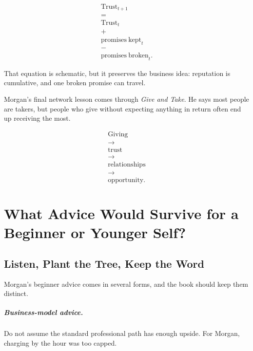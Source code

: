 \documentclass[11pt,oneside]{book}
\begin{document}
\begin{equation}
\begin{gathered}
\mathrm{Trust}_{t+1}\\
=\\
\mathrm{Trust}_{t}\\
+\\
\mathrm{promises\ kept}_{t}\\
-\\
\mathrm{promises\ broken}_{t}.
\end{gathered}
\end{equation}

That equation is schematic, but it preserves the business idea: reputation is cumulative, and one broken promise can travel.

Morgan's final network lesson comes through \emph{Give and Take}. He says most people are takers, but people who give without expecting anything in return often end up receiving the most.

\begin{equation}
\begin{gathered}
\mathrm{Giving}\\
\longrightarrow\\
\mathrm{trust}\\
\longrightarrow\\
\mathrm{relationships}\\
\longrightarrow\\
\mathrm{opportunity}.
\end{gathered}
\end{equation}

\chapter{What Advice Would Survive for a Beginner or Younger Self?}

\section{Listen, Plant the Tree, Keep the Word}

Morgan's beginner advice comes in several forms, and the book should keep them distinct.

\paragraph{Business-model advice.}
Do not assume the standard professional path has enough upside. For Morgan, charging by the hour was too capped.
\end{document}
